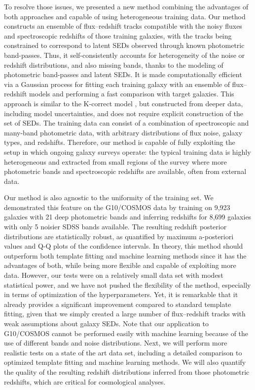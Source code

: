 \documentclass[aps,prd,showpacs,superscriptaddress,groupedaddress]{revtex4}  %
\begin{document}
To resolve those issues, we presented a new method combining the advantages of both approaches and capable of using heterogeneous training data.
Our method constructs an ensemble of flux--redshift tracks compatible with the noisy fluxes and spectroscopic redshifts of those training galaxies, with the tracks being constrained to correspond to latent SEDs observed through known photometric band-passes.
Thus, it self-consistently accounts for heterogeneity of the noise or redshift distributions, and also missing bands, thanks to the modeling of photometric band-passes and latent SEDs. 
It is made computationally efficient via a Gaussian process for fitting each training galaxy with an ensemble of flux--redshift models and performing a fast comparison with target galaxies. 
This approach is similar to the K-correct model \citep{Blanton:2007}, but constructed from deeper data, including model uncertainties, and does not require explicit construction of the set of SEDs.
The training data can consist of a combination of spectroscopic and many-band photometric data, with arbitrary distributions of flux noise, galaxy types, and redshifts.
Therefore, our method is capable of fully exploiting the setup in which ongoing galaxy surveys operate: the typical training data is highly heterogeneous and extracted from small regions of the survey where more photometric bands and spectroscopic redshifts are available, often from external data. 

Our method is also agnostic to the uniformity of the training set.
We demonstrated this feature on the G10/COSMOS data by training on 9,923 galaxies with 21 deep photometric bands and inferring redshifts for 8,699 galaxies with only 5 noisier SDSS bands available. 
The resulting redshift posterior distributions are statistically robust, as quantified by maximum a-posteriori values and Q-Q plots of the confidence intervals. 
In theory, this method should outperform both template fitting and machine learning methods since it has the advantages of both, while being more flexible and capable of exploiting more data. 
However, our tests were on a relatively small data set with modest statistical power, and we have not pushed the flexibility of the method, especially in terms of optimization of the hyperparameters.
Yet, it is remarkable that it already provides a significant improvement compared to standard template fitting, given that we simply created a large number of flux--redshift tracks with weak assumptions about galaxy SEDs.
Note that our application to G10/COSMOS cannot be performed easily with machine learning because of the use of different bands and noise distributions.
Next, we will perform more realistic tests on a state of the art data set, including a detailed comparison to optimized template fitting and machine learning methods.
We will also quantify the quality of the resulting redshift distributions inferred from those photometric redshifts, which are critical for cosmological analyses.
\end{document}
